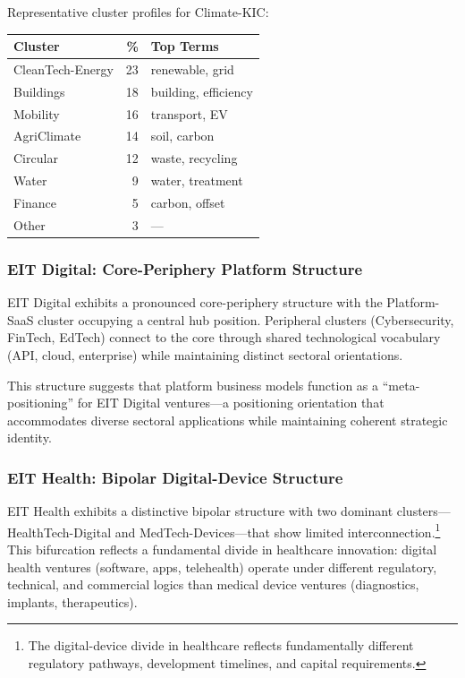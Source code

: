\documentclass[../main.tex]{subfiles}
\begin{document}
Representative cluster profiles for Climate-KIC:

\begin{margintable}
\centering
\small
\begin{tabular}{lrl}
\toprule
\textbf{Cluster} & \textbf{\%} & \textbf{Top Terms} \\
\midrule
CleanTech-Energy & 23 & renewable, grid \\
Buildings & 18 & building, efficiency \\
Mobility & 16 & transport, EV \\
AgriClimate & 14 & soil, carbon \\
Circular & 12 & waste, recycling \\
Water & 9 & water, treatment \\
Finance & 5 & carbon, offset \\
Other & 3 & --- \\
\bottomrule
\end{tabular}
\caption{Climate-KIC cluster composition}
\end{margintable}

\subsubsection{EIT Digital: Core-Periphery Platform Structure}

EIT Digital exhibits a pronounced core-periphery structure with the Platform-SaaS cluster occupying a central hub position. Peripheral clusters (Cybersecurity, FinTech, EdTech) connect to the core through shared technological vocabulary (API, cloud, enterprise) while maintaining distinct sectoral orientations.

This structure suggests that platform business models function as a ``meta-positioning'' for EIT Digital ventures---a positioning orientation that accommodates diverse sectoral applications while maintaining coherent strategic identity.

\subsubsection{EIT Health: Bipolar Digital-Device Structure}

EIT Health exhibits a distinctive bipolar structure with two dominant clusters---HealthTech-Digital and MedTech-Devices---that show limited interconnection.\footnote{The digital-device divide in healthcare reflects fundamentally different regulatory pathways, development timelines, and capital requirements.} This bifurcation reflects a fundamental divide in healthcare innovation: digital health ventures (software, apps, telehealth) operate under different regulatory, technical, and commercial logics than medical device ventures (diagnostics, implants, therapeutics).
\end{document}
